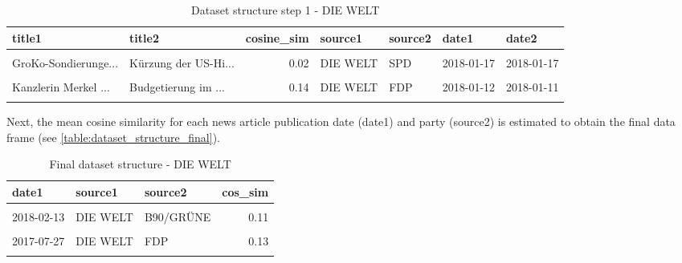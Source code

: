 \documentclass[
  12pt,
]{article}
\begin{document}
\begin{table}[H]

\caption{\label{tab:Dataset structure 1}Dataset structure step 1 - DIE WELT \label{table:dataset_structure1}}
\centering
\fontsize{7}{9}\selectfont
\begin{tabular}[t]{llrllll}
\toprule
title1 & title2 & cosine\_sim & source1 & source2 & date1 & date2\\
\midrule
\cellcolor{gray!6}{G-20-Randale in H...} & \cellcolor{gray!6}{Bezahlbarer Wohnr...} & \cellcolor{gray!6}{0.01} & \cellcolor{gray!6}{DIE WELT} & \cellcolor{gray!6}{SPD} & \cellcolor{gray!6}{2017-11-21} & \cellcolor{gray!6}{2017-11-15}\\
GroKo-Sondierunge... & Kürzung der US-Hi... & 0.02 & DIE WELT & SPD & 2018-01-17 & 2018-01-17\\
\cellcolor{gray!6}{Internationale Pr...} & \cellcolor{gray!6}{Der Widerstand ge...} & \cellcolor{gray!6}{0.26} & \cellcolor{gray!6}{DIE WELT} & \cellcolor{gray!6}{DIE LINKE} & \cellcolor{gray!6}{2017-09-25} & \cellcolor{gray!6}{2017-09-21}\\
Kanzlerin Merkel ... & Budgetierung im ... & 0.14 & DIE WELT & FDP & 2018-01-12 & 2018-01-11\\
\cellcolor{gray!6}{Seehofer über Gre...} & \cellcolor{gray!6}{EU-Erweiterung: G...} & \cellcolor{gray!6}{0.38} & \cellcolor{gray!6}{DIE WELT} & \cellcolor{gray!6}{B90/GRÜNE} & \cellcolor{gray!6}{2018-02-08} & \cellcolor{gray!6}{2018-02-06}\\
\bottomrule
\end{tabular}
\end{table}

Next, the mean cosine similarity for each news article publication date
(date1) and party (source2) is estimated to obtain the final data frame
(see \autoref{table:dataset_structure_final}).

\begin{table}[H]

\caption{\label{tab:Dataset structure final}Final dataset structure - DIE WELT \label{table:dataset_structure_final}}
\centering
\fontsize{7}{9}\selectfont
\begin{tabular}[t]{lllr}
\toprule
date1 & source1 & source2 & cos\_sim\\
\midrule
\cellcolor{gray!6}{2017-09-20} & \cellcolor{gray!6}{DIE WELT} & \cellcolor{gray!6}{CDU} & \cellcolor{gray!6}{0.22}\\
2018-02-13 & DIE WELT & B90/GRÜNE & 0.11\\
\cellcolor{gray!6}{2017-12-01} & \cellcolor{gray!6}{DIE WELT} & \cellcolor{gray!6}{CDU} & \cellcolor{gray!6}{0.11}\\
2017-07-27 & DIE WELT & FDP & 0.13\\
\cellcolor{gray!6}{2017-09-06} & \cellcolor{gray!6}{DIE WELT} & \cellcolor{gray!6}{CDU} & \cellcolor{gray!6}{0.15}\\
\bottomrule
\end{tabular}
\end{table}
\end{document}
